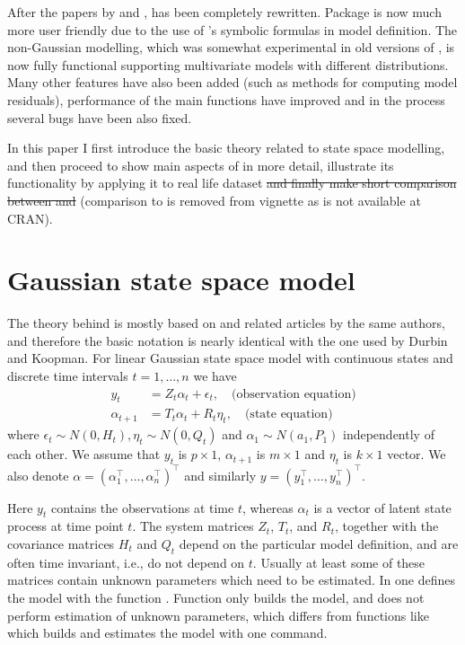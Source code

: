 \documentclass[nojss,article]{jss}\usepackage[]{graphicx}\usepackage[]{color}
\begin{document}
After the papers by \citet{Petris2010} and \citet{Tusell2010},  has been completely rewritten. Package is now much more user friendly due to the use of 's symbolic formulas in model definition. The non-Gaussian modelling, which was somewhat experimental in old versions of , is now fully functional supporting multivariate models with different distributions. Many other features have also been added (such as methods for computing model residuals), performance of the main functions have improved and in the process several bugs have been also fixed.

In this paper I first introduce the basic theory related to state space modelling, and then proceed to show main aspects of  in more detail, illustrate its functionality by applying it to real life dataset \sout{and finally make short comparison between  and } (comparison to  is removed from vignette as  is not available at CRAN).

\section{Gaussian state space model}

The theory behind  is mostly based on \citet{DK2012} and related articles by the same authors, and therefore the basic notation is nearly identical with the one used by Durbin and Koopman.
For linear Gaussian state space model with continuous states and discrete time intervals $t=1,\ldots,n$ we have
\begin{equation}\label{ssgeneral}
\begin{aligned}
y_t &= Z_t\alpha_t + \epsilon_t, \quad \textrm{(observation equation)}\\
\alpha_{t+1} &= T_t\alpha_t + R_t\eta_{t}, \quad \textrm{(state equation)}
\end{aligned}
\end{equation}
where $\epsilon_{t} \sim N(0,H_t), \eta_{t} \sim N(0,Q_t)$ and $\alpha_1 \sim
N(a_1,P_1)$ independently of each other. We assume that $y_t$ is $p\times 1$,
$\alpha_{t+1}$ is $m \times 1$ and $\eta_{t}$ is $k \times 1$ vector. We also denote $\alpha = (\alpha^\top_1,\ldots,\alpha^\top_n)^\top$ and similarly $y = (y^\top_1,\ldots,y^\top_n)^\top$.

Here $y_t$ contains the observations at time $t$, whereas $\alpha_t$ is a vector of latent state process at time point $t$. The system matrices $Z_t$, $T_t$, and $R_t$, together with the covariance matrices $H_t$ and $Q_t$ depend on the particular model definition, and are often time invariant, i.e., do not depend on $t$. Usually at least some of these matrices contain unknown parameters which need to be estimated. In  one defines the model with the function . Function  only builds the model, and does not perform estimation of unknown parameters, which differs from functions like  which builds and estimates the model with one command.
\end{document}
